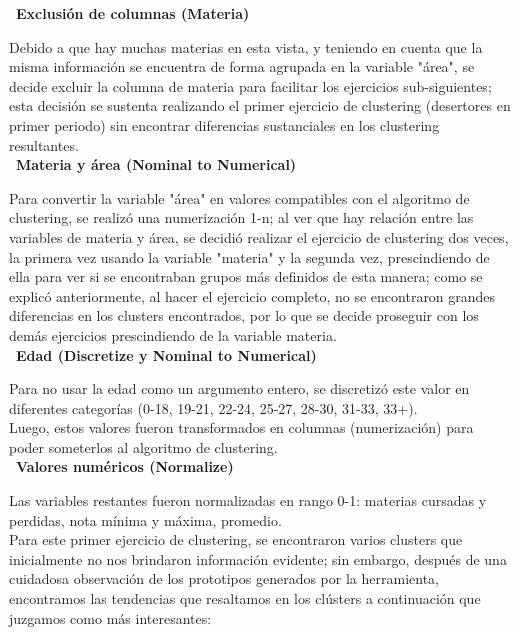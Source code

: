 \documentclass[fleqn,10pt]{SelfArx} %
\begin{document}
\textbullet\ {\bf Exclusión de columnas (Materia)\\}

Debido a que hay muchas materias en esta vista, y teniendo en cuenta que la misma información se encuentra de forma agrupada en la variable "área", se decide excluir la columna de materia para facilitar los ejercicios sub-siguientes; esta decisión se sustenta realizando el primer ejercicio de clustering (desertores en primer periodo) sin encontrar diferencias sustanciales en los clustering resultantes.\\

\textbullet\ {\bf Materia y área (Nominal to Numerical)\\}

Para convertir la variable "área" en valores compatibles con el algoritmo de clustering, se realizó una numerización 1-n; al ver que hay relación entre las variables de materia y área, se decidió realizar el ejercicio de clustering dos veces, la primera vez usando la variable "materia" y la segunda vez, prescindiendo de ella para ver si se encontraban grupos más definidos de esta manera; como se explicó anteriormente, al hacer el ejercicio completo, no se encontraron grandes diferencias en los clusters encontrados, por lo que se decide proseguir con los demás ejercicios prescindiendo de la variable materia.\\

\textbullet\ {\bf Edad (Discretize y Nominal to Numerical)\\}

Para no usar la edad como un argumento entero, se discretizó este valor en diferentes categorías (0-18, 19-21, 22-24, 25-27, 28-30, 31-33, 33+).\\

Luego, estos valores fueron transformados en columnas (numerización) para poder someterlos al algoritmo de clustering.\\

\textbullet\ {\bf Valores numéricos (Normalize)\\}

Las variables restantes fueron normalizadas en rango 0-1: materias cursadas y perdidas, nota mínima y máxima, promedio.\\

Para este primer ejercicio de clustering, se encontraron varios clusters que inicialmente no nos brindaron información evidente; sin embargo, después de una cuidadosa observación de los prototipos generados por la herramienta, encontramos las tendencias que resaltamos en los clústers a continuación que juzgamos como más interesantes:\\
\end{document}
